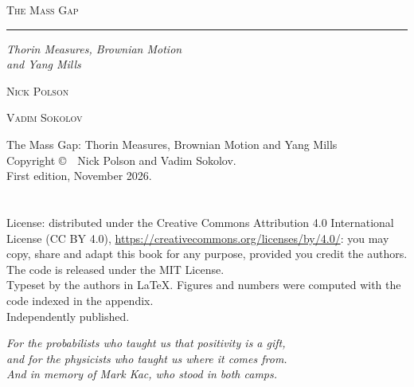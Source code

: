 \documentclass[11pt,twoside,openany]{book}
\theoremstyle{plainsc}
\theoremstyle{defsc}
\begin{document}
\frontmatter
\pagestyle{empty}
\begin{titlepage}
\centering
\vspace*{1.2in}
{\Huge\scshape The Mass Gap\par}
\vspace{0.8em}
{\color[rgb]{0.72,0.56,0.2}\rule{2.4in}{0.6pt}\par}
\vspace{0.8em}
{\large\itshape Thorin Measures, Brownian Motion\\ and Yang Mills\par}
\vfill
{\large\scshape Nick Polson\par}
\vspace{0.4em}
{\large\scshape Vadim Sokolov\par}
\vspace{1.2in}
\end{titlepage}

\newpage
\vspace*{\fill}
{\small
\noindent The Mass Gap: Thorin Measures, Brownian Motion and Yang Mills\\[0.5em]
\noindent Copyright \copyright\ \BookYear\ Nick Polson and Vadim Sokolov.\\[0.5em]
\noindent First edition, November 2026.%
\ifx\BookISBNline\empty\else\\[0.5em]\noindent\BookISBNline\fi
\ifx\BookDOIline\empty\else\\[0.5em]\noindent\BookDOIline\fi
\\[0.5em]\noindent License: distributed under the Creative Commons Attribution 4.0 International License (CC BY 4.0), \url{https://creativecommons.org/licenses/by/4.0/}: you may copy, share and adapt this book for any purpose, provided you credit the authors. The code is released under the MIT License.\\[0.5em]
\noindent Typeset by the authors in \LaTeX. Figures and numbers were computed with the code indexed in the appendix.\\[0.5em]
\noindent Independently published.\par}

\cleardoublepage
\vspace*{2in}
\begin{center}
\itshape For the probabilists who taught us that positivity is a gift,\\ and for the physicists who taught us where it comes from.\\[0.8em] And in memory of Mark Kac, who stood in both camps.
\end{center}
\end{document}
